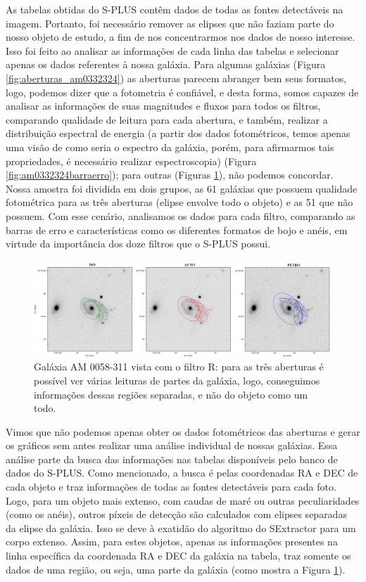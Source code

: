 As tabelas obtidas do S-PLUS contêm dados de todas as fontes detectáveis na imagem. Portanto, foi necessário remover as elipses que não faziam parte do nosso objeto de estudo, a fim de nos concentrarmos nos dados de nosso interesse. Isso foi feito ao analisar as informações de cada linha das tabelas e selecionar apenas os dados referentes à nossa galáxia. Para algumas galáxias (Figura \ref{fig:aberturas_am0332324}) as aberturas parecem abranger bem seus formatos, logo, podemos dizer que a fotometria é confiável, e desta forma, somos capazes de analisar as informações de suas magnitudes e fluxos para todos os filtros, comparando qualidade de leitura para cada abertura, e também, realizar a distribuição espectral de energia (a partir dos dados fotométricos, temos apenas uma visão de como seria o espectro da galáxia, porém, para afirmarmos tais propriedades, é necessário realizar espectroscopia) (Figura \ref{fig:am0332324barraerro}); para outras (Figuras \ref{fig:aberturas_am0058311}), não podemos concordar. Nossa amostra foi dividida em dois grupos, as 61 galáxias que possuem qualidade fotométrica para as três aberturas (elipse envolve todo o objeto) e as 51 que não possuem. Com esse cenário, analisamos os dados para cada filtro, comparando as barras de erro e características como os diferentes formatos de bojo e anéis, em virtude da importância dos doze filtros que o S-PLUS possui.

\begin{figure}[h]
  \centering 
  \includegraphics[width=1.0\textwidth]{Imagens/aberturas_am0058311.png} 
  \caption[Aberturas aplicadas à galáxia AM 0058-311.]{Galáxia AM 0058-311 vista com o filtro R: para as três aberturas é possível ver várias leituras de partes da galáxia, logo, conseguimos informações dessas regiões separadas, e não do objeto como um todo.}
  \label{fig:aberturas_am0058311} 
\end{figure}

Vimos que não podemos apenas obter os dados fotométricos das aberturas e gerar os gráficos sem antes realizar uma análise individual de nossas galáxias. Essa análise parte da busca das informações nas tabelas disponíveis pelo banco de dados do S-PLUS. Como mencionado, a busca é pelas coordenadas RA e DEC de cada objeto e traz informações de todas as fontes detectáveis para cada foto. Logo, para um objeto mais extenso, com caudas de maré ou outras peculiaridades (como os anéis), outros píxeis de detecção são calculados com elipses separadas da elipse da galáxia. Isso se deve à exatidão do algoritmo do SExtractor para um corpo extenso. Assim, para estes objetos, apenas as informações presentes na linha específica da coordenada RA e DEC da galáxia na tabela, traz somente os dados de uma região, ou seja, uma parte da galáxia (como mostra a Figura \ref{fig:aberturas_am0058311}).

